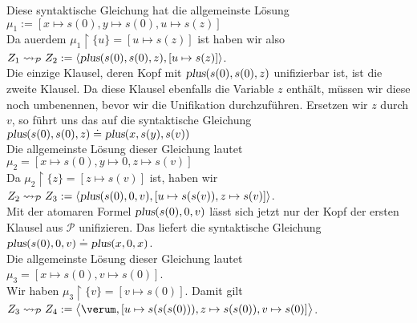 Diese syntaktische Gleichung hat die allgemeinste L\"{o}sung \\[0.1cm]
\hspace*{1.3cm}  $\mu_1 := [ x \mapsto s(0), y \mapsto s(0), u \mapsto s(z) ]$ \\[0.1cm]
Da au\3erdem $\mu_1 \restriction \{u\} = [ u \mapsto s(z)]$ ist haben wir also \\[0.1cm]
\hspace*{1.3cm} $Z_1 \leadsto_\mathcal{P} Z_2 := \langle \textsl{plus}(s(0),s(0),z), [ u \mapsto s(z) ] \rangle$. \\[0.1cm]
Die einzige Klausel, deren Kopf mit $\textsl{plus}(s(0),s(0),z)$ unifizierbar ist, ist die zweite Klausel.
Da diese Klausel ebenfalls die Variable $z$ enth\"{a}lt, m\"{u}ssen wir diese noch umbenennen, bevor wir die Unifikation durchzuf\"{u}hren.
Ersetzen wir $z$ durch $v$, so  f\"{u}hrt uns das auf  die syntaktische Gleichung \\[0.1cm]
\hspace*{1.3cm} $\textsl{plus}(s(0),s(0),z) \doteq \textsl{plus}(x,s(y),s(v))$ \\[0.1cm]
Die allgemeinste L\"{o}sung dieser Gleichung lautet \\[0.1cm]
\hspace*{1.3cm} $\mu_2 = [ x \mapsto s(0), y \mapsto 0, z \mapsto s(v)]$ \\[0.1cm]
Da $\mu_2 \restriction \{z\} = [ z \mapsto s(v) ]$ ist, haben wir \\[0.1cm]
\hspace*{1.3cm} $Z_2 \leadsto_\mathcal{P} Z_3 := \langle \textsl{plus}(s(0), 0, v), [u \mapsto s(s(v)), z \mapsto s(v)]\rangle$. \\[0.1cm]
Mit der atomaren Formel $\textsl{plus}(s(0), 0, v)$ l\"{a}sst sich jetzt nur der Kopf der
ersten Klausel aus $\mathcal{P}$ unifizieren.  Das liefert die syntaktische Gleichung \\[0.1cm]
\hspace*{1.3cm} $\textsl{plus}(s(0), 0, v) \doteq \textsl{plus}(x,0,x)$. \\[0.1cm]
Die allgemeinste L\"{o}sung dieser Gleichung lautet \\[0.1cm]
\hspace*{1.3cm} $\mu_3 = [ x \mapsto s(0), v \mapsto s(0)]$. \\[0.1cm]
Wir haben $\mu_3 \restriction \{v\} = [ v \mapsto s(0) ]$.  Damit gilt \\[0.1cm]
\hspace*{1.3cm} $Z_3 \leadsto_\mathcal{P} Z_4 := \big\langle \verum, [u \mapsto s(s(s(0))), z \mapsto s(s(0)), v \mapsto s(0)] \big\rangle$. \\[0.1cm]
